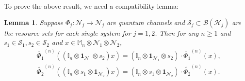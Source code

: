 \documentclass[11pt,reqno]{amsart}
\numberwithin{equation}{section}
\newtheorem{lemma}{Lemma}[section]
\newcommand{\mb}{\mathbb}
\newcommand{\wt}{\widetilde}
\newcommand{\mc}{\mathcal}
\begin{document}
To prove the above result, we need a compatibility lemma:
\begin{lemma}\label{lemma:compatibility}
Suppose $\Phi_j: \mc N_j \to \mc N_j$ are quantum channels and $\mc S_j \subset \mc B(\mc H_j)$ are the resource sets for each single system for $j = 1,2$. Then for any $n\ge 1$ and $s_1\in \mc S_1, s_2\in \mc S_2$ and $x \in \mb M_n \otimes \mc N_1\otimes \mc N_2$,
    \begin{equation}
    \begin{aligned}
 & \wt{\Phi_1}^{(n)}\left((\mb I_n \otimes \textbf{1}_{\mc N_1} \otimes s_2)x \right) = (\mb I_n \otimes \textbf{1}_{\mc N_1} \otimes s_2) \cdot \wt{\Phi_1}^{(n)}\left(x \right), \\
  &  \wt{\Phi_2}^{(n)}\left((\mb I_n \otimes s_1 \otimes \textbf{1}_{\mc N_2})x \right) = (\mb I_n \otimes s_1 \otimes \textbf{1}_{\mc N_2}) \cdot \wt{\Phi_2}^{(n)}\left(x \right).
    \end{aligned}
    \end{equation}
\end{lemma}
\end{document}
